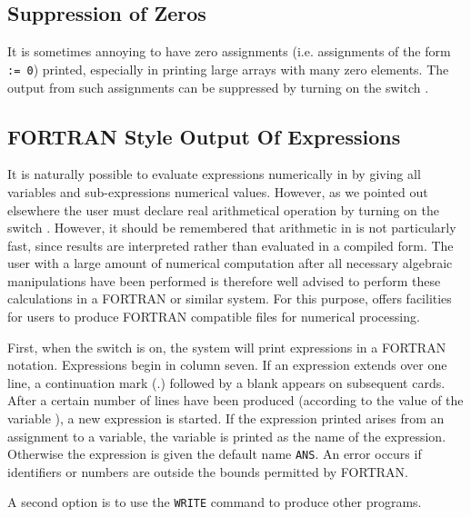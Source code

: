 \subsection{Suppression of Zeros}
\hypertarget{switch:NERO}{}

It is sometimes annoying to have zero assignments (i.e. assignments of the
form \texttt{ := 0}) printed, especially in printing large arrays
with many zero elements.  The output from such assignments can be
suppressed by turning on the switch .

\subsection{{FORTRAN} Style Output Of Expressions}

It is naturally possible to evaluate expressions numerically in {\REDUCE} by
giving all variables and sub-expressions numerical values. However, as we
pointed out elsewhere the user must declare real arithmetical operation by
turning on the switch .  However, it should be
remembered that arithmetic in {\REDUCE} is not particularly fast, since
results are interpreted rather than evaluated in a compiled form. The user
with a large amount of numerical computation after all necessary algebraic
manipulations have been performed is therefore well advised to perform
these calculations in a FORTRAN or similar system.  For
this purpose, {\REDUCE} offers facilities for users to produce FORTRAN
compatible files for numerical processing.

\hypertarget{reserved:CARD_NO}{}
\hypertarget{switch:FORT}{}
First, when the switch  is on, the system will
print expressions in a FORTRAN notation.  Expressions begin in column
seven.  If an expression extends over one line, a continuation mark (.)
followed by a blank appears on subsequent cards.  After a certain number
of lines have been produced (according to the value of the variable
),
a new expression is started.  If the
expression printed arises from an assignment to a variable, the variable
is printed as the name of the expression.  Otherwise the expression is
given the default name \texttt{ANS}.  An error occurs if identifiers or
numbers are outside the bounds permitted by FORTRAN.

A second option is to use the \texttt{WRITE} command to produce other programs.


